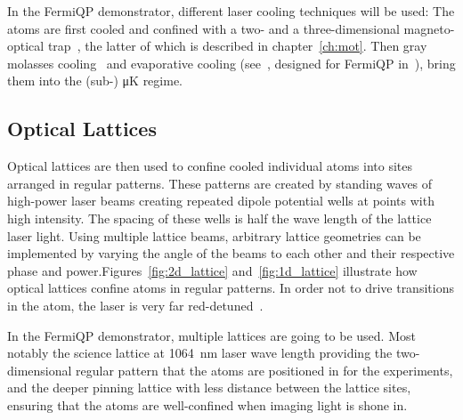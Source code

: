In the FermiQP demonstrator, different laser cooling techniques will be used: The atoms are first cooled and confined with a two- and a three-dimensional magneto-optical trap~\cite{foot_atomic_2005}, the latter of which is described in chapter~\ref{ch:mot}. Then gray molasses cooling~\cite{weidemuller_novel_1994} and evaporative cooling (see~\cite{foot_atomic_2005}, designed for FermiQP in~\cite{sun_construction_2022}), bring them into the (sub-) \si[]{\micro\kelvin} regime.

\subsection*{Optical Lattices}
Optical lattices are then used to confine cooled individual atoms into sites arranged in regular patterns. These patterns are created by standing waves of high-power laser beams creating repeated dipole potential wells at points with high intensity. The spacing of these wells is half the wave length of the lattice laser light. Using multiple lattice beams, arbitrary lattice geometries can be implemented by varying the angle of the beams to each other and their respective phase and power.Figures~\ref{fig:2d_lattice} and~\ref{fig:1d_lattice} illustrate how optical lattices confine atoms in regular patterns. In order not to drive transitions in the atom, the laser is very far red-detuned~\cite{bloch_many-body_2008, bloch_quantum_2012}.

In the FermiQP demonstrator, multiple lattices are going to be used. Most notably the science lattice at \SI[]{1064}{\nano\meter} laser wave length providing the two-dimensional regular pattern that the atoms are positioned in for the experiments, and the deeper pinning lattice with less distance between the lattice sites, ensuring that the atoms are well-confined when imaging light is shone in.

